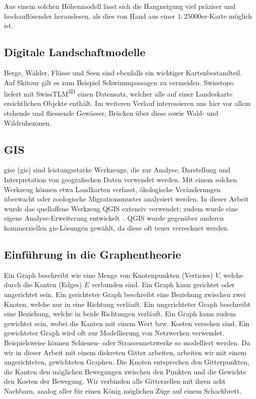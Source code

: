 Aus einem solchen Höhenmodell lässt sich die Hangneigung viel präziser und hochauflösender herauslesen, als dies von Hand aus einer $1:25000$er-Karte möglich ist.

\subsection{Digitale Landschaftmodelle}

Berge, Wälder, Flüsse und Seen sind ebenfalls ein wichtiger Kartenbestandteil. Auf Skitour gilt es zum Beispiel Schwimmpassagen zu vermeiden. Swisstopo liefert mit SwissTLM\textsuperscript{3D} einen Datensatz, welcher alle auf einer Landeskarte ersichtlichen Objekte enthält. Im weiteren Verlauf interessieren uns hier vor allem stehende und fliessende Gewässer, Brücken über diese sowie Wald- und Wildruhezonen.

\subsection{GIS}\label{sec:gis}

\acrlong{gis}e (\acrshort{gis}) sind leistungsstarke Werkzeuge, die zur Analyse, Darstellung und Interpretation von geografischen Daten verwendet werden. Mit einem solchen Werkzeug können etwa Landkarten verfasst, ökologische Veränderungen überwacht oder zoologische Migrationsmuster analysiert werden.
In dieser Arbeit wurde das quelloffene Werkzeug QGIS extensiv verwendet; zudem wurde eine eigene Analyse-Erweiterung entwickelt~\cite{qgis}. QGIS wurde gegenüber anderen kommerziellen \gls{gis}-Lösungen gewählt, da diese oft teuer verrechnet werden.

\subsection{Einführung in die Graphentheorie}

Ein Graph beschreibt wie eine Menge von Knotenpunkten (Verticies) $V$, welche durch die Kanten (Edges) $E$ verbunden sind. Ein Graph kann gerichtet oder ungerichtet sein. Ein gerichteter Graph beschreibt eine Beziehung zwischen zwei Knoten, welche nur in eine Richtung verläuft. Ein ungerichteter Graph beschreibt eine Beziehung, welche in beide Richtungen verläuft. Ein Graph kann zudem gewichtet sein, wobei die Kanten mit einem Wert bzw. Kosten versehen sind. Ein gewichteter Graph wird oft zur Modellierung von Netzwerken verwendet. Beispielsweise können Schienen- oder Strassennetzwerke so modelliert werden. 
Da wir in dieser Arbeit mit einem diskreten Gitter arbeiten, arbeiten wir mit einem ungerichteten, gewichteten Graphen. Die Knoten entsprechen den Gitterpunkten, die Kanten den möglichen Bewegungen zwischen den Punkten und die Gewichte den Kosten der Bewegung. Wir verbinden alle Gitterzellen mit ihren acht Nachbarn, analog aller für einen König möglichen Züge auf einem Schachbrett.


